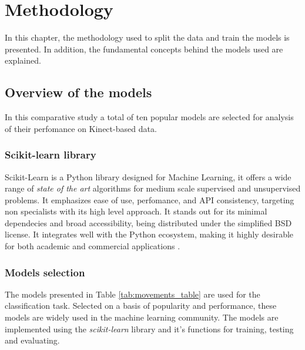 %
%
\chapter{Methodology} \label{chap:methodology}
\hypersetup{colorlinks=true, linkcolor=red}

    In this chapter, the methodology used to split the data and train the models is presented. In addition, the fundamental concepts behind the models used are explained.

    \section{Overview of the models}

        In this comparative study a total of ten popular models are selected for analysis of their perfomance on Kinect-based data.

        \subsection{Scikit-learn library}  

            Scikit-Learn is a Python library designed for Machine Learning, it offers a wide range of \textit{state of the art} algorithms for medium scale supervised and unsupervised problems. It emphasizes ease of use, perfomance, and API consistency, targeting non specialists with its high level approach. It stands out for its minimal dependecies and broad accessibility, being distributed under the simplified BSD license. It integrates well with the Python ecosystem, making it highly desirable for both academic and commercial applications \cite{scikit-learn}.

        \subsection{Models selection}

        The models presented in Table \ref{tab:movements_table} are used for the classification task. Selected on a basis of popularity and performance, these models are widely used in the machine learning community. The models are implemented using the \textit{scikit-learn} library and it's functions for training, testing and evaluating\cite{sklearn_api}. 

        \newpage 

